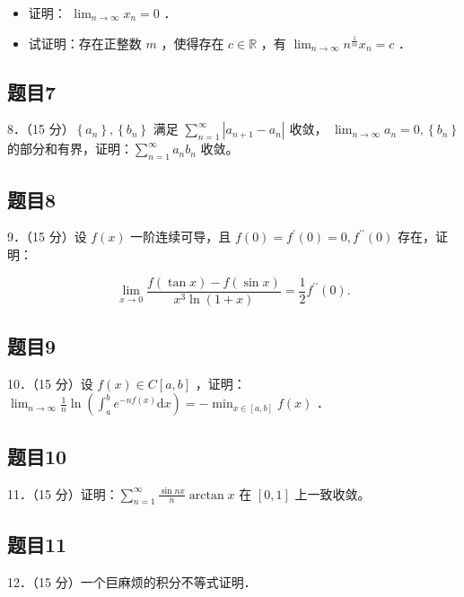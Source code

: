 \documentclass{article}
\begin{document}
\begin{itemize}
  \item[（1）] 证明： \(\lim _{n \rightarrow \infty} x_{n}=0\) ．
  \item[（2）] 试证明：存在正整数 \(m\) ，使得存在 \(c \in \mathbb{R}\) ，有 \(\lim _{n \rightarrow \infty} n^{\frac{1}{m}} x_{n}=c\) ．
\end{itemize}

\subsection{题目7}
8．（15 分）\(\left\{a_{n}\right\},\left\{b_{n}\right\}\) 满足 \(\sum_{n=1}^{\infty}\left|a_{n+1}-a_{n}\right|\) 收敛， \(\lim _{n \rightarrow \infty} a_{n}=0,\left\{b_{n}\right\}\) 的部分和有界，证明：\(\sum_{n=1}^{\infty} a_{n} b_{n}\) 收敛。

\subsection{题目8}
9．（15 分）设 \(f(x)\) 一阶连续可导，且 \(f(0)=f^{\prime}(0)=0, f^{\prime \prime}(0)\) 存在，证明：

\[
\lim _{x \rightarrow 0} \frac{f(\tan x)-f(\sin x)}{x^{3} \ln (1+x)}=\frac{1}{2} f^{\prime \prime}(0) .
\]

\subsection{题目9}
10．（15 分）设 \(f(x) \in C[a, b]\) ，证明： \(\lim _{n \rightarrow \infty} \frac{1}{n} \ln \left(\int_{a}^{b} e^{-n f(x)} \mathrm{d} x\right)=-\min _{x \in[a, b]} f(x)\) ．

\subsection{题目10}
11．（15 分）证明：\(\sum_{n=1}^{\infty} \frac{\sin n x}{n} \arctan x\) 在 \([0,1]\) 上一致收敛。

\subsection{题目11}
12．（15 分）一个巨麻烦的积分不等式证明．
\end{document}
